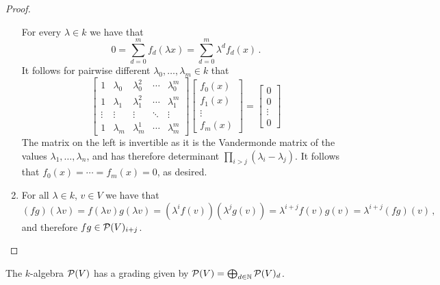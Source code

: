 \begin{proof}
\begin{enumerate}
      For every $\lambda \in k$ we have that
      \[
          0
        = \sum_{d=0}^m f_d(\lambda x)
        = \sum_{d=0}^m \lambda^d f_d(x) \,.
      \]
      It follows for pairwise different $\lambda_0, \dotsc, \lambda_m \in k$ that
      \[
          \begin{bmatrix}
              1
            & \lambda_0
            & \lambda_0^2
            & \cdots
            & \lambda_0^m
            \\
              1
            & \lambda_1
            & \lambda_1^2
            & \cdots
            & \lambda_1^m
            \\
              \vdots
            & \vdots
            & \vdots
            & \ddots
            & \vdots
            \\
              1
            & \lambda_m
            & \lambda_m^1
            & \cdots
            & \lambda_m^m
          \end{bmatrix}
          \begin{bmatrix}
            f_0(x)  \\
            f_1(x)  \\
            \vdots  \\
            f_m(x)
          \end{bmatrix}
        = \begin{bmatrix}
            0       \\
            0       \\
            \vdots  \\
            0
          \end{bmatrix}
      \]
      The matrix on the left is invertible as it is the Vandermonde matrix of the values $\lambda_1, \dotsc, \lambda_n$, and has therefore determinant $\prod_{i > j} (\lambda_i - \lambda_j)$.
      It follows that $f_0(x) = \dotsb = f_m(x) = 0$, as desired.
    \item
      For all $\lambda \in k$, $v \in V$ we have that
      \[
          (fg)(\lambda v)
        = f(\lambda v) g(\lambda v)
        = \left( \lambda^i f(v) \right)\left( \lambda^j g(v) \right)
        = \lambda^{i+j} f(v) g(v)
        = \lambda^{i+j} (fg)(v) \,,
      \]
      and therefore $fg \in \mathcal{P}(V)_{i+j}$.
    \qedhere
  \end{enumerate}
\end{proof}


\begin{corollary}
  The $k$-algebra $\mathcal{P}(V)$ has a grading given by $\mathcal{P}(V) = \bigoplus_{d \in \mathbb{N}} \mathcal{P}(V)_d$.
\end{corollary}


